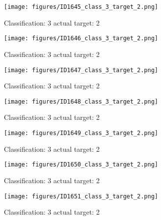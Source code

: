 \begin{figure}[h!]
\begin{center}
\texttt{[image: figures/ID1645\_class\_3\_target\_2.png]}
\end{center}
\caption{ Classification: 3 actual target: 2}
\label{fig:ID1645_class_3_target_2}
\end{figure}
\begin{figure}[h!]
\begin{center}
\texttt{[image: figures/ID1646\_class\_3\_target\_2.png]}
\end{center}
\caption{ Classification: 3 actual target: 2}
\label{fig:ID1646_class_3_target_2}
\end{figure}
\begin{figure}[h!]
\begin{center}
\texttt{[image: figures/ID1647\_class\_3\_target\_2.png]}
\end{center}
\caption{ Classification: 3 actual target: 2}
\label{fig:ID1647_class_3_target_2}
\end{figure}
\begin{figure}[h!]
\begin{center}
\texttt{[image: figures/ID1648\_class\_3\_target\_2.png]}
\end{center}
\caption{ Classification: 3 actual target: 2}
\label{fig:ID1648_class_3_target_2}
\end{figure}
\begin{figure}[h!]
\begin{center}
\texttt{[image: figures/ID1649\_class\_3\_target\_2.png]}
\end{center}
\caption{ Classification: 3 actual target: 2}
\label{fig:ID1649_class_3_target_2}
\end{figure}
\begin{figure}[h!]
\begin{center}
\texttt{[image: figures/ID1650\_class\_3\_target\_2.png]}
\end{center}
\caption{ Classification: 3 actual target: 2}
\label{fig:ID1650_class_3_target_2}
\end{figure}
\begin{figure}[h!]
\begin{center}
\texttt{[image: figures/ID1651\_class\_3\_target\_2.png]}
\end{center}
\caption{ Classification: 3 actual target: 2}
\label{fig:ID1651_class_3_target_2}
\end{figure}
